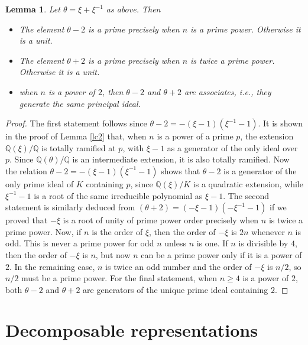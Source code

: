 \documentclass{article}
\newtheorem{Lem}[Prop]{Lemma}
\theoremstyle{definition}
\theoremstyle{remark}
\begin{document}
\begin{Lem}\label{lc4}
    Let $\theta=\xi+\xi^{-1}$ as above. Then
    \begin{itemize}
    \item The element $\theta-2$ is a prime 
    precisely when $n$ is a prime power. Otherwise it is a unit.
    \item The element $\theta+2$ is a prime 
    precisely when $n$ is twice a prime power. Otherwise it is a unit.
    \item when $n$ is a power of $2$, then
    $\theta-2$ and $\theta+2$ are associates, i.e.,
    they generate the same principal ideal.
    \end{itemize}
\end{Lem}

\begin{proof}
   The first statement follows since 
   $\theta-2=-(\xi-1)(\xi^{-1}-1)$. It is shown in 
   the proof of Lemma \ref{lc2} that, when
   $n$ is a power of a prime $p$, the extension
   $\mathbb{Q}(\xi)/\mathbb{Q}$ is totally
   ramified at $p$, with $\xi-1$ as a generator
   of the only ideal over $p$. Since 
   $\mathbb{Q}(\theta)/\mathbb{Q}$ is an
   intermediate extension, it is also totally
   ramified. Now the relation 
   $\theta-2=-(\xi-1)(\xi^{-1}-1)$ shows that
   $\theta-2$ is a generator of the only prime 
   ideal of $K$ containing $p$, since
   $\mathbb{Q}(\xi)/K$ is a quadratic extension,
   while $\xi^{-1}-1$ is a root of the same 
   irreducible polynomial as $\xi-1$. The second 
   statement is similarly deduced from
   $(\theta+2)=(-\xi-1)(-\xi^{-1}-1)$ if we proved
   that $-\xi$ is a root of unity of prime power 
   order precisely when $n$ is twice a prime 
   power. Now, if $n$ is the order of $\xi$,
   then the order of $-\xi$ is $2n$ whenever $n$
   is odd. This is never a prime power for odd
   $n$ unless $n$ is one. If $n$ is divisible by 
   $4$, then the order of $-\xi$ is $n$, but now
   $n$ can be a prime power only if it is
   a power of $2$. In the remaining case, 
   $n$ is twice an odd number and the order
   of $-\xi$ is $n/2$, so $n/2$ must be a prime
   power. For the final statement, when $n\geq4$ is
   a power of $2$, both $\theta-2$ and $\theta+2$
   are generators of the unique prime ideal containing $2$.
\end{proof}



\section{Decomposable representations}\label{S6}
\end{document}
